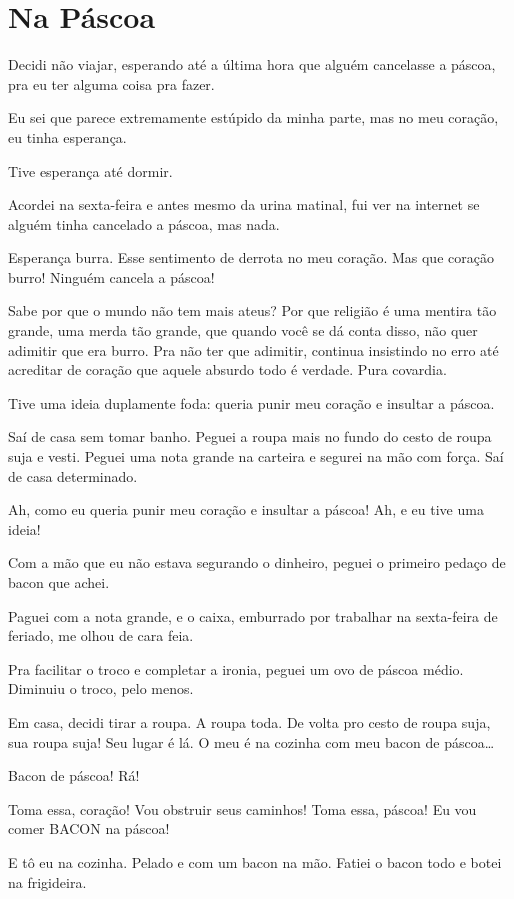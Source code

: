 \chapter{Na Páscoa}

Decidi não viajar, esperando até a última hora que alguém cancelasse a páscoa, pra eu ter alguma coisa pra fazer.

Eu sei que parece extremamente estúpido da minha parte, mas no meu coração, eu tinha esperança.

Tive esperança até dormir.

Acordei na sexta-feira e antes mesmo da urina matinal, fui ver na internet se alguém tinha cancelado a páscoa, mas nada.

Esperança burra. Esse sentimento de derrota no meu coração. Mas que coração burro! Ninguém cancela a páscoa!

Sabe por que o mundo não tem mais ateus? Por que religião é uma mentira tão grande, uma merda tão grande, que quando você se dá conta disso, não quer adimitir que era burro. Pra não ter que adimitir, continua insistindo no erro até acreditar de coração que aquele absurdo todo é verdade. Pura covardia.

Tive uma ideia duplamente foda: queria punir meu coração e insultar a páscoa.

Saí de casa sem tomar banho. Peguei a roupa mais no fundo do cesto de roupa suja e vesti. Peguei uma nota grande na carteira e segurei na mão com força. Saí de casa determinado.

Ah, como eu queria punir meu coração e insultar a páscoa! Ah, e eu tive uma ideia!

Com a mão que eu não estava segurando o dinheiro, peguei o primeiro pedaço de bacon que achei.

Paguei com a nota grande, e o caixa, emburrado por trabalhar na sexta-feira de feriado, me olhou de cara feia.

Pra facilitar o troco e completar a ironia, peguei um ovo de páscoa médio. Diminuiu o troco, pelo menos.

Em casa, decidi tirar a roupa. A roupa toda. De volta pro cesto de roupa suja, sua roupa suja! Seu lugar é lá. O meu é na cozinha com meu bacon de páscoa\ldots

Bacon de páscoa! Rá!

Toma essa, coração! Vou obstruir seus caminhos! Toma essa, páscoa! Eu vou comer BACON na páscoa!

E tô eu na cozinha. Pelado e com um bacon na mão. Fatiei o bacon todo e botei na frigideira.

